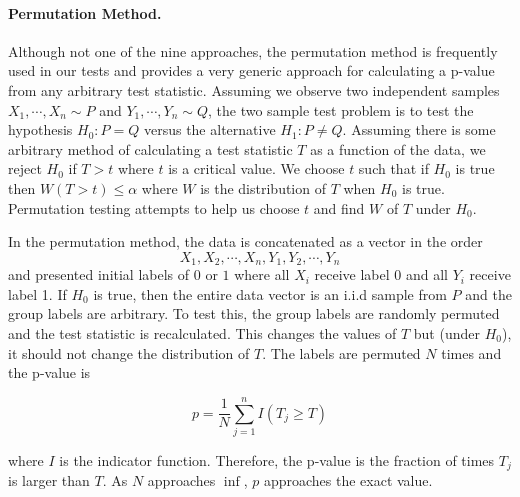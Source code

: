 \documentclass[12pt]{article}
\begin{document}
\paragraph{Permutation Method.} Although not one of the nine approaches, the permutation method is frequently used in our tests and provides a very generic approach for calculating a p-value from any arbitrary test statistic. Assuming we observe two independent samples $X_{1}, \cdots, X_{n} \sim P$ and $Y_{1}, \cdots, Y_{n} \sim Q$, the two sample test problem is to test the hypothesis $H_{0} : P = Q$ versus the alternative $H_{1} : P \neq Q$. Assuming there is some arbitrary method of calculating a test statistic $T$ as a function of the data, we reject $H_{0}$ if $T > t$ where $t$ is a critical value. We choose $t$ such that if $H_{0}$ is true then $W(T > t) \leq \alpha$ where $W$ is the distribution of $T$ when $H_{0}$ is true. Permutation testing attempts to help us choose $t$ and find $W$ of $T$ under $H_{0}$. 

In the permutation method, the data is concatenated as a vector in the order \[X_{1}, X_{2}, \cdots, X_{n}, Y_{1}, Y_{2}, \cdots, Y_{n}\] and presented initial labels of $0$ or $1$ where all $X_{i}$ receive label 0 and all $Y_{i}$ receive label 1. If $H_{0}$ is true, then the entire data vector is an i.i.d sample from $P$ and the group labels are arbitrary. To test this, the group labels are randomly permuted and the test statistic is recalculated. This changes the values of $T$ but (under $H_{0}$), it should not change the distribution of $T$. The labels are permuted $N$ times and the p-value is

\[ p = \frac{1}{N}\sum^{n}_{j=1} I(T_{j} \geq T) \]

where $I$ is the indicator function. Therefore, the p-value is the fraction of times $T_{j}$ is larger than $T$. As $N$ approaches $\inf$, $p$ approaches the exact value.
\end{document}
